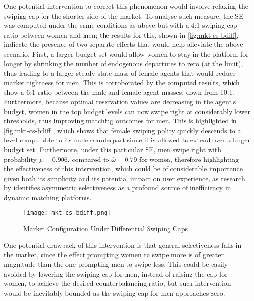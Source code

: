 One potential intervention to correct this phenomenon would involve relaxing the swiping cap for the shorter side of the market.
To analyse such measure, the SE was computed under the same conditions as above but with a 4:1 swiping cap ratio between women and men; the results for this, shown in \autoref{fig:mkt-cs-bdiff}, indicate the presence of two separate effects that would help alleviate the above scenario. 
First, a larger budget set would allow women to stay in the platform for longer by shrinking the number of endogenous departures to zero (at the limit), thus leading to a larger steady state mass of female agents that would reduce market tightness for men. 
This is corroborated by the computed results, which show a 6:1 ratio between the male and female agent masses, down from 10:1. 
Furthermore, because optimal reservation values are decreasing in the agent's budget, women in the top budget levels can now swipe right at considerably lower thresholds, thus improving matching outcomes for men. 
This is highlighted in \autoref{fig:mkt-cs-bdiff}, which shows that female swiping policy quickly descends to a level comparable to its male counterpart since it is allowed to extend over a larger budget set. 
Furthermore, under this particular SE, men swipe right with probability $\overline\mu=0.906$, compared to $\overline\omega=0.79$ for women, therefore highlighting the effectiveness of this intervention, which could be of considerable importance given both its simplicity and its potential impact on user experience, as research by \cite{kanoria2021facilitating} identifies asymmetric selectiveness as a profound source of inefficiency in dynamic matching platforms. 
\begin{figure}[ht]
    \centering
    \caption{Market Configuration Under Differential Swiping Caps}
    \texttt{[image: mkt-cs-bdiff.png]}
    \label{fig:mkt-cs-bdiff} 
\end{figure}
One potential drawback of this intervention is that general selectiveness falls in the market, since the effect prompting women to swipe more is of greater magnitude than the one prompting men to swipe less. 
This could be easily avoided by lowering the swiping cap for men, instead of raising the cap for women, to achieve the desired counterbalancing ratio, but such intervention would be inevitably bounded as the swiping cap for men approaches zero.
